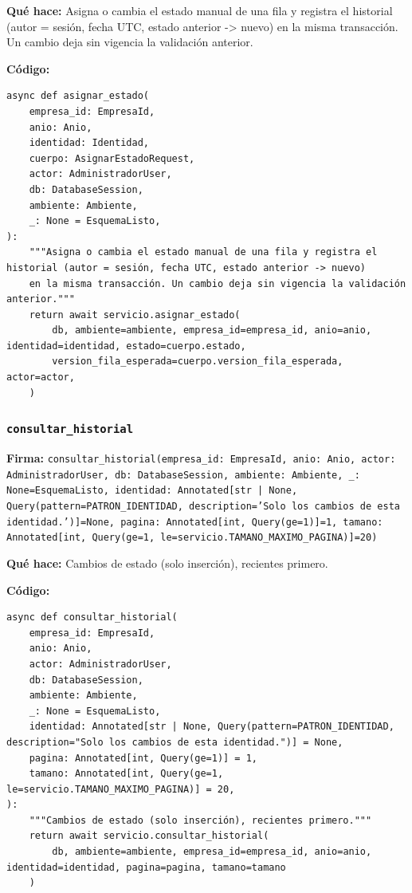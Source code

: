 \documentclass[11pt,a4paper]{article}
\begin{document}
\textbf{Qué hace:} Asigna o cambia el estado manual de una fila y registra el historial (autor = sesión, fecha UTC, estado anterior -> nuevo)
en la misma transacción. Un cambio deja sin vigencia la validación anterior.

\textbf{Código:}
\begin{lstlisting}
async def asignar_estado(
    empresa_id: EmpresaId,
    anio: Anio,
    identidad: Identidad,
    cuerpo: AsignarEstadoRequest,
    actor: AdministradorUser,
    db: DatabaseSession,
    ambiente: Ambiente,
    _: None = EsquemaListo,
):
    """Asigna o cambia el estado manual de una fila y registra el historial (autor = sesión, fecha UTC, estado anterior -> nuevo)
    en la misma transacción. Un cambio deja sin vigencia la validación anterior."""
    return await servicio.asignar_estado(
        db, ambiente=ambiente, empresa_id=empresa_id, anio=anio, identidad=identidad, estado=cuerpo.estado,
        version_fila_esperada=cuerpo.version_fila_esperada, actor=actor,
    )
\end{lstlisting}

\subsubsection*{\texttt{consultar\_historial}}
\textbf{Firma:} \texttt{consultar\_historial(empresa\_id: EmpresaId, anio: Anio, actor: AdministradorUser, db: DatabaseSession, ambiente: Ambiente, \_: None=EsquemaListo, identidad: Annotated[str | None, Query(pattern=PATRON\_IDENTIDAD, description='Solo los cambios de esta identidad.')]=None, pagina: Annotated[int, Query(ge=1)]=1, tamano: Annotated[int, Query(ge=1, le=servicio.TAMANO\_MAXIMO\_PAGINA)]=20)}

\textbf{Qué hace:} Cambios de estado (solo inserción), recientes primero.

\textbf{Código:}
\begin{lstlisting}
async def consultar_historial(
    empresa_id: EmpresaId,
    anio: Anio,
    actor: AdministradorUser,
    db: DatabaseSession,
    ambiente: Ambiente,
    _: None = EsquemaListo,
    identidad: Annotated[str | None, Query(pattern=PATRON_IDENTIDAD, description="Solo los cambios de esta identidad.")] = None,
    pagina: Annotated[int, Query(ge=1)] = 1,
    tamano: Annotated[int, Query(ge=1, le=servicio.TAMANO_MAXIMO_PAGINA)] = 20,
):
    """Cambios de estado (solo inserción), recientes primero."""
    return await servicio.consultar_historial(
        db, ambiente=ambiente, empresa_id=empresa_id, anio=anio, identidad=identidad, pagina=pagina, tamano=tamano
    )
\end{lstlisting}
\end{document}
